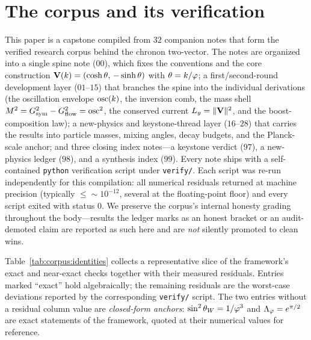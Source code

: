 \section{The corpus and its verification}\label{app:corpus}

This paper is a capstone compiled from $32$ companion notes that form the verified
research corpus behind the chronon two-vector. The notes are organized into a single
spine note ($00$), which fixes the conventions and the core construction $\mathbf{V}(k)=(\cosh\theta,\,-\sinh\theta)$ with
$\theta=k/\varphi$; a first/second-round development layer ($01$--$15$) that branches the spine into
the individual derivations (the oscillation envelope $\operatorname{osc}(k)$, the inversion comb, the mass
shell $M^2=G_{\mathrm{sym}}^2-G_{\mathrm{flow}}^2=\operatorname{osc}^2$, the conserved current $L_{y}=\|\mathbf{V}\|^2$, and the
boost-composition law); a new-physics and keystone-thread layer ($16$--$28$) that carries the
results into particle masses, mixing angles, decay budgets, and the Planck-scale anchor; and
three closing index notes---a keystone verdict ($97$), a new-physics ledger ($98$), and a
synthesis index ($99$). Every note ships with a self-contained \texttt{python} verification
script under \texttt{verify/}. Each script was re-run independently for this compilation:
all numerical residuals returned at machine precision (typically $\le \sim 10^{-12}$, several
at the floating-point floor) and every script exited with status $0$. We preserve the corpus's
internal honesty grading throughout the body---results the ledger marks as an honest bracket or
an audit-demoted claim are reported as such here and are \emph{not} silently promoted to clean wins.

Table~\ref{tab:corpus:identities} collects a representative slice of the framework's
exact and near-exact checks together with their measured residuals. Entries marked ``exact''
hold algebraically; the remaining residuals are the worst-case deviations reported by the
corresponding \texttt{verify/} script. The two entries without a residual column value are
\emph{closed-form anchors}: $\sin^2\theta_W=1/\varphi^3$ and $\Lambda_\varphi=e^{\pi/2}$ are
exact statements of the framework, quoted at their numerical values for reference.

